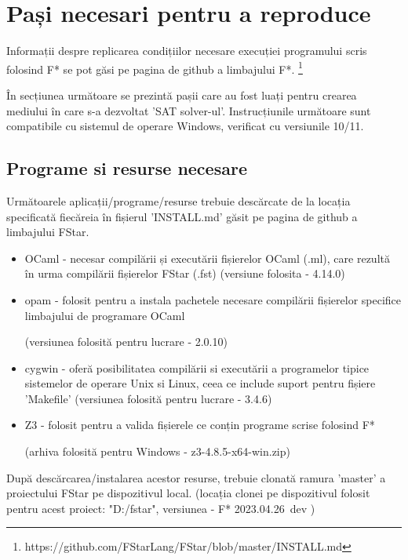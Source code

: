 \chapter{Pași necesari pentru a reproduce}

Informații despre replicarea condițiilor necesare execuției programului scris folosind F* se pot găsi pe pagina de github a limbajului F*. \footnote{https://github.com/FStarLang/FStar/blob/master/INSTALL.md}

În secțiunea următoare se prezintă pașii care au fost luați pentru crearea \newline mediului în care s-a dezvoltat 'SAT solver-ul'. Instrucțiunile următoare sunt \newline compatibile cu sistemul de operare Windows, verificat cu versiunile 10/11. 

\section{Programe si resurse necesare}

Următoarele aplicații/programe/resurse trebuie descărcate de la locația specificată fiecăreia în fișierul 'INSTALL.md' găsit pe pagina de github a limbajului FStar.

\begin{itemize}
 \item OCaml - necesar compilării și executării fișierelor OCaml (.ml), care rezultă în urma compilării fișierelor FStar (.fst)
	(versiune folosita - 4.14.0)
 \item opam - folosit pentru a instala pachetele necesare compilării fișierelor specifice limbajului de programare OCaml 
 
 (versiunea folosită pentru lucrare - 2.0.10)
 \item cygwin - oferă posibilitatea compilării si executării a programelor tipice \newline sistemelor de operare Unix si Linux, ceea ce include suport pentru fișiere \newline  'Makefile' 
 (versiunea folosită pentru lucrare - 3.4.6)
 \item Z3 - folosit pentru a valida fișierele ce conțin programe scrise folosind F*
 
 (arhiva folosită pentru Windows - z3-4.8.5-x64-win.zip)
\end{itemize}

\newpage


După descărcarea/instalarea acestor resurse, trebuie clonată ramura 'master' a proiectului FStar pe dispozitivul local. (locația clonei pe dispozitivul folosit pentru acest proiect: "D:/fstar", versiunea  - F* 2023.04.26~dev )

